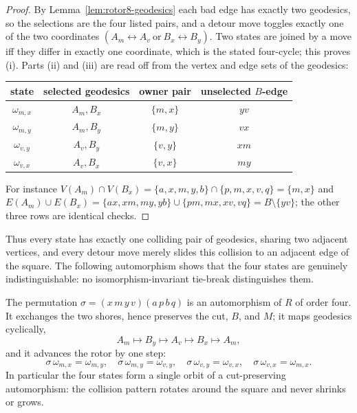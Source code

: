 \begin{proof}
By Lemma~\ref{lem:rotor8-geodesics} each bad edge has exactly two
geodesics, so the selections are the four listed pairs, and a detour
move toggles exactly one of the two coordinates
\((A_m\leftrightarrow A_v\ \text{or}\ B_x\leftrightarrow B_y)\). Two
states are joined by a move iff they differ in exactly one coordinate,
which is the stated four-cycle; this proves (i). Parts (ii) and (iii)
are read off from the vertex and edge sets of the geodesics:
\begin{center}
\begin{tabular}{c@{\qquad}c@{\qquad}c@{\qquad}c}
\toprule
state & selected geodesics & owner pair & unselected \(B\)-edge\\
\midrule
\(\omega_{m,x}\) & \(A_m,B_x\) & \(\{m,x\}\) & \(yv\)\\
\(\omega_{m,y}\) & \(A_m,B_y\) & \(\{m,y\}\) & \(vx\)\\
\(\omega_{v,y}\) & \(A_v,B_y\) & \(\{v,y\}\) & \(xm\)\\
\(\omega_{v,x}\) & \(A_v,B_x\) & \(\{v,x\}\) & \(my\)\\
\bottomrule
\end{tabular}
\end{center}
For instance
\(V(A_m)\cap V(B_x)=\{a,x,m,y,b\}\cap\{p,m,x,v,q\}=\{m,x\}\) and
\(E(A_m)\cup E(B_x)=\{ax,xm,my,yb\}\cup\{pm,mx,xv,vq\}
=B\setminus\{yv\}\); the other three rows are identical checks.
\end{proof}

Thus every state has exactly one colliding pair of geodesics, sharing
two adjacent vertices, and every detour move merely slides this
collision to an adjacent edge of the square. The following automorphism
shows that the four states are genuinely indistinguishable: no
isomorphism-invariant tie-break distinguishes them.

\begin{proposition}[Neutrality]\label{prop:rotor8-neutral}
The permutation \(\sigma=(x\,m\,y\,v)(a\,p\,b\,q)\) is an automorphism
of \(R\) of order four. It exchanges the two shores, hence preserves
the cut, \(B\), and \(M\); it maps geodesics cyclically,
\[
 A_m\longmapsto B_y\longmapsto A_v\longmapsto B_x\longmapsto A_m ,
\]
and it advances the rotor by one step:
\[
 \sigma\,\omega_{m,x}=\omega_{m,y},\quad
 \sigma\,\omega_{m,y}=\omega_{v,y},\quad
 \sigma\,\omega_{v,y}=\omega_{v,x},\quad
 \sigma\,\omega_{v,x}=\omega_{m,x}.
\]
In particular the four states form a single orbit of a cut-preserving
automorphism: the collision pattern rotates around the square and never
shrinks or grows.
\end{proposition}


